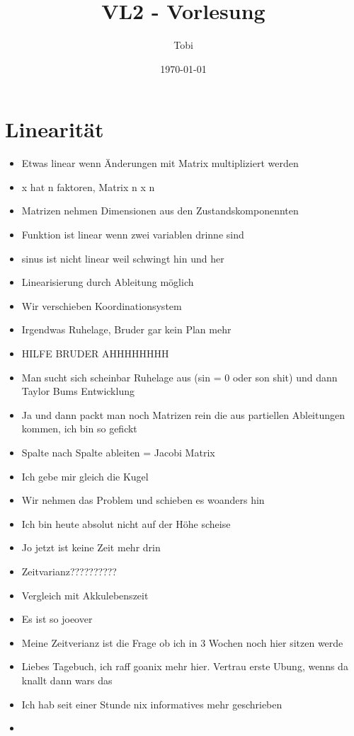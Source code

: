 \documentclass[a4paper,12pt]{article}
\title{VL2 - Vorlesung}
\author{Tobi}
\date{\today}
\begin{document}
\maketitle
\tableofcontents
\newpage

\section*{Linearität}

\begin{itemize}
    \item Etwas linear wenn Änderungen mit Matrix multipliziert werden
    \item x hat n faktoren, Matrix n x n 
    \item Matrizen nehmen Dimensionen aus den Zustandskomponennten
    \item Funktion ist linear wenn zwei variablen drinne sind
    \item sinus ist nicht linear weil schwingt hin und her 
    \item Linearisierung durch Ableitung möglich 
    \item Wir verschieben Koordinationsystem 
    \item Irgendwas Ruhelage, Bruder gar kein Plan mehr 
    \item HILFE BRUDER AHHHHHHHH
    \item Man sucht sich scheinbar Ruhelage aus (sin = 0 oder son shit) und dann Taylor Bums Entwicklung 
    \item Ja und dann packt man noch Matrizen rein die aus partiellen Ableitungen kommen, ich bin so gefickt 
    \item Spalte nach Spalte ableiten = Jacobi Matrix 
    \item Ich gebe mir gleich die Kugel 
    \item Wir nehmen das Problem und schieben es woanders hin 
    \item Ich bin heute absolut nicht auf der Höhe scheise 
    \item Jo jetzt ist keine Zeit mehr drin 
    \item Zeitvarianz??????????
    \item Vergleich mit Akkulebenszeit 
    \item Es ist so joeover
    \item Meine Zeitverianz ist die Frage ob ich in 3 Wochen noch hier sitzen werde 
    \item Liebes Tagebuch, ich raff goanix mehr hier. Vertrau erste Ubung, wenns da knallt dann wars das 
    \item Ich hab seit einer Stunde nix informatives mehr geschrieben 
    \item 
\end{itemize}
\end{document}
